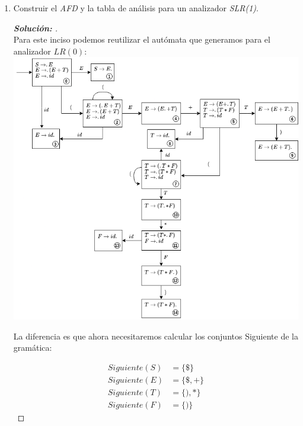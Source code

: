 \documentclass{article}
\begin{document}
\begin{enumerate}
\begin{enumerate}
\begin{proof}[\textbf{Solución: }]
            Finalmente, podemos ver que la gramática proporcionada es $LR(0)$ pues se logró generar la tabla de análisis sintáctica de manera correcta sin conflictos. \\
        \end{proof}
        
        \item Construir el \textit{AFD} y la tabla de análisis para un analizador \textit{SLR(1)}.
        \begin{proof}[\textbf{Solución: }]
            \quad \\

            Para este inciso podemos reutilizar el autómata que generamos para el analizador $LR(0)$: \\

            \includegraphics[scale=0.5]{Ej1AFD.png}

            La diferencia es que ahora necesitaremos calcular los conjuntos Siguiente de la gramática:

            \begin{align*}
                Siguiente(S) & = \{\$\} \\
                Siguiente(E) & = \{\$, +\} \\
                Siguiente(T) & = \{), *\} \\
                Siguiente(F) & = \{)\}
            \end{align*}


\end{proof}
\end{enumerate}
\end{enumerate}
\end{document}
